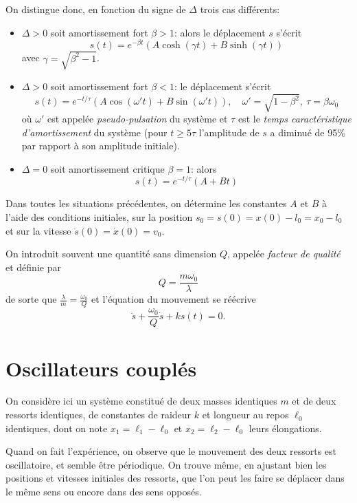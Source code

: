 \documentclass{article}
\theoremstyle{definition}
\begin{document}
On distingue donc, en fonction du signe de $\Delta$ trois cas différents:
\begin{itemize}
	\item $\Delta > 0$ soit amortissement fort $\beta > 1$: alors le déplacement $s$ s'écrit
	\[\boxed{
	s(t) = e^{-\beta t}\left(A\cosh(\gamma t) + B\sinh(\gamma t)\right)}
	\]
	avec $\gamma = \sqrt{\beta^2-1}$.
	\item $\Delta > 0$ soit amortissement fort $\beta < 1$: le déplacement s'écrit
	\[\boxed{
	s(t) = e^{-t/\tau}\left(A\cos(\omega't)+B\sin(\omega't)\right),}\quad \omega' = \sqrt{1-\beta^2}, \ \tau = \beta\omega_0
	\]
	où $\omega'$ est appelée \textit{pseudo-pulsation} du système et $\tau$ est le \textit{temps caractéristique d'amortissement} du système (pour $t\geq 5\tau$ l'amplitude de $s$ a diminué de 95\% par rapport à son amplitude initiale).
	\item $\Delta=0$ soit amortissement critique $\beta=1$: alors
	\[\boxed{
	s(t) = e^{-t/\tau}(A+Bt)}
	\]
\end{itemize}

Dans toutes les situations précédentes, on détermine les constantes $A$ et $B$ à l'aide des conditions initiales, sur la position $s_0 = s(0) = x(0) - l_0 = x_0-l_0$ et sur la vitesse $\dot{s}(0) = \dot{x}(0) = v_0$.

On introduit souvent une quantité sans dimension $Q$, appelée \textit{facteur de qualité} et définie par
\[
Q = \frac{m\omega_0}{\lambda}
\]
de sorte que $\displaystyle\frac{\lambda}{m}=\frac{\omega_0}{Q}$ et l'équation du mouvement se réécrive
\[
\ddot{s} + \frac{\omega_0}{Q}\dot{s} + ks(t) = 0.
\]

\section{Oscillateurs couplés}


On considère ici un système constitué de deux masses identiques $m$ et de deux ressorts identiques, de constantes de raideur $k$ et longueur au repos $\ell_0$ identiques, dont on note $x_1=\ell_1-\ell_0$ et $x_2=\ell_2-\ell_0$ leurs élongations.

Quand on fait l'expérience, on observe que le mouvement des deux ressorts est oscillatoire, et semble être périodique. On trouve même, en ajustant bien les positions et vitesses initiales des ressorts, que l'on peut les faire se déplacer dans le même sens ou encore dans des sens opposés.
\end{document}
